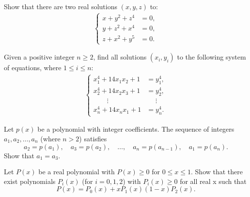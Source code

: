 \documentclass[12pt,a4paper]{memoir}
\theoremstyle{definition}
\begin{document}
\begin{question}[name={1990 Austrian--Polish}]
	Show that there are two real solutions $(x,y,z)$ to:
	\begin{align*}
		\begin{cases}
			x + y^2 + z^4 &= 0,\\
			y + z^2 + x^4 &= 0,\\
			z + x^2 + y^5 &= 0.
		\end{cases}
	\end{align*}
\end{question}



\begin{question}[name={1990 Austrian--Polish}]
	Given a positive integer $n\geq 2$, find all solutions $(x_i,y_i)$ to the following system of equations, where $1 \leq i \leq n$:
	\begin{align*}
		\begin{cases}
			x_1^4 + 14x_1x_2 + 1  &= y_1^4,\\
			x_2^4 + 14x_2x_3 + 1  &= y_2^4,\\
			\qquad \vdots &\phantom{=} \vdots\\
			x_n^4 + 14x_nx_1 + 1  &= y_n^4.
		\end{cases}
	\end{align*}
\end{question}



\begin{question}[name={1990 Austrian--Polish}]
	Let $p(x)$ be a polynomial with integer coefficients. The sequence of integers $a_1, a_2, \dots , a_n$ (where $n > 2$) satisfies
	\[a_2 = p(a_1), \quad a_3 = p(a_2),\quad \dots , \quad a_n = p(a_{n-1}),\quad a_1 = p(a_n).\] Show that $a_1 = a_3$.
\end{question}




\begin{question}[name={1991 Austrian--Polish}]
	Let $P(x)$ be a real polynomial with $P(x) \ge 0$ for $0 \le x \le  1$. Show that there exist polynomials $P_i (x)$ (for $i = 0, 1,2$) with $P_i (x) \ge 0$ for all real x such that \[P (x) = P_0 (x) + xP_1 (x)( 1- x)P_2 (x).\]
\end{question}
\end{document}
